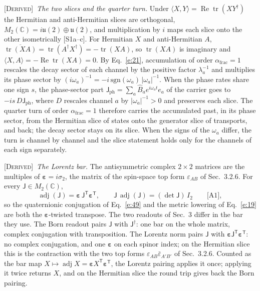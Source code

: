 \documentclass[10pt]{article}
\newcommand{\sJ}{\mathsf{J}}
\newcommand{\afrac}{\alpha_{\mathrm{frac}}}
\newcommand{\tr}{\operatorname{tr}}
\newcommand{\adj}{\operatorname{adj}}
\DeclareMathOperator{\Real}{Re}
\newcommand{\Derived}{\noindent\textsc{[Derived]}\ }
\begin{document}
\smallskip
\Derived \textit{The two slices and the quarter turn.} Under $\langle X,Y\rangle=\Real\tr(XY^\dagger)$ the Hermitian and anti-Hermitian slices are orthogonal, $M_2(\mathbb C)=i\mathfrak u(2)\oplus\mathfrak u(2)$, and multiplication by $i$ maps each slice onto the other isometrically [S1a--c]. For Hermitian $X$ and anti-Hermitian $A$, $\overline{\tr(XA)}=\tr(A^\dagger X^\dagger)=-\tr(XA)$, so $\tr(XA)$ is imaginary and $\langle X,A\rangle=-\Real\tr(XA)=0$. By Eq.~\eqref{e:21}, accumulation of order $\afrac=1$ rescales the decay sector of each channel by the positive factor $\lambda_a^{-1}$ and multiplies its phase sector by $(i\omega_a)^{-1}=-i\,\mathrm{sgn}(\omega_a)\,|\omega_a|^{-1}$. When the phase rates share one sign $s$, the phase-sector part $\sJ_{\mathrm{ph}}=\sum_a\hat B_ae^{i\omega_at}e_a$ of the carrier goes to $-is\,D\sJ_{\mathrm{ph}}$, where $D$ rescales channel $a$ by $|\omega_a|^{-1}>0$ and preserves each slice. The quarter turn of order $\afrac=1$ therefore carries the accumulated past, in its phase sector, from the Hermitian slice of states onto the generator slice of transports, and back; the decay sector stays on its slice. When the signs of the $\omega_a$ differ, the turn is channel by channel and the slice statement holds only for the channels of each sign separately.

\smallskip
\Derived \textit{The Lorentz bar.} The antisymmetric complex $2\times2$ matrices are the multiples of $\boldsymbol\varepsilon=i\sigma_2$, the matrix of the spin-space top form $\varepsilon_{AB}$ of Sec.~3.2.6. For every $\sJ\in M_2(\mathbb C)$,
\begin{equation}
\adj(\sJ)=\boldsymbol\varepsilon\,\sJ^{\mathsf T}\boldsymbol\varepsilon^{\mathsf T},\qquad \sJ\,\adj(\sJ)=(\det\sJ)\,I_2\qquad\text{[A1]},\label{e:66}
\end{equation}
so the quaternionic conjugation of Eq.~\eqref{e:49} and the metric lowering of Eq.~\eqref{e:19} are both the $\boldsymbol\varepsilon$-twisted transpose. The two readouts of Sec.~3 differ in the bar they use. The Born readout pairs $\sJ$ with $\sJ^\dagger$: one bar on the whole matrix, complex conjugation with transposition. The Lorentz norm pairs $\sJ$ with $\boldsymbol\varepsilon\sJ^{\mathsf T}\boldsymbol\varepsilon^{\mathsf T}$: no complex conjugation, and one $\boldsymbol\varepsilon$ on each spinor index; on the Hermitian slice this is the contraction with the two top forms $\varepsilon_{AB}\bar\varepsilon_{A'B'}$ of Sec.~3.2.6. Counted as the bar map $X\mapsto\adj X=\boldsymbol\varepsilon X^{\mathsf T}\boldsymbol\varepsilon^{\mathsf T}$, the Lorentz pairing applies it once; applying it twice returns $X$, and on the Hermitian slice the round trip gives back the Born pairing.
\end{document}
